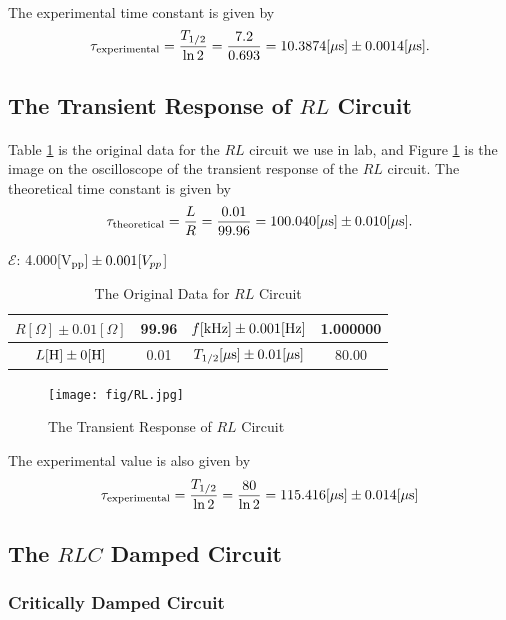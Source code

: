\documentclass{my_template}
\newcommand{\e}{\mathcal{E}}
\begin{document}
    \paragraph{}The experimental time constant is given by \[\tau_{\rm experimental}=\frac{T_{1/2}}{\ln 2}=\frac{7.2}{0.693}=10.3874[\mu \rm s]\pm 0.0014[\mu s].\]
    \subsection{The Transient Response of $RL$ Circuit}\label{sec:RL}
    \paragraph{} Table \ref{tab:RL} is the original data for the $RL$ circuit we use in lab, and Figure \ref{fig:RLresponse} is the image on the oscilloscope of the transient response of the $RL$ circuit. The theoretical time constant is given by $$\tau_{\rm theoretical}=\frac{L}{R}=\frac{0.01}{99.96}=100.040[\mu \rm s]\pm 0.010[\mu s].$$
    \begin{table}[H]
        \begin{center}
            $\e$: 4.000[V$_{\rm pp}]\pm 0.001 [V_{pp}$]
            \begin{tabular}{|c|c|c|c|}
                \hline
                $R[\Omega]\pm 0.01[\Omega]$&99.96&$f[\rm kHz]\pm 0.001[Hz]$&1.000000\\\hline
                $L[\rm H]\pm 0[H]$&0.01&$T_{1/2}[\rm \mu s]\pm 0.01[\mu s]$&80.00\\\hline
            \end{tabular}
        \end{center}
        \caption{The Original Data for $RL$ Circuit}
        \label{tab:RL}
    \end{table}
    \begin{figure}[H]
        \centering
        \texttt{[image: fig/RL.jpg]}
        \caption{The Transient Response of $RL$ Circuit}
        \label{fig:RLresponse}
    \end{figure}
    The experimental value is also given by \[\tau_{\rm experimental}=\frac{T_{1/2}}{\ln 2}=\frac{80}{\ln 2}=115.416[\mu \rm s]\pm 0.014[\mu s]\]
    \subsection{The $RLC$ Damped Circuit}
    \subsubsection{Critically Damped Circuit}\label{sec:RLC}
\end{document}
